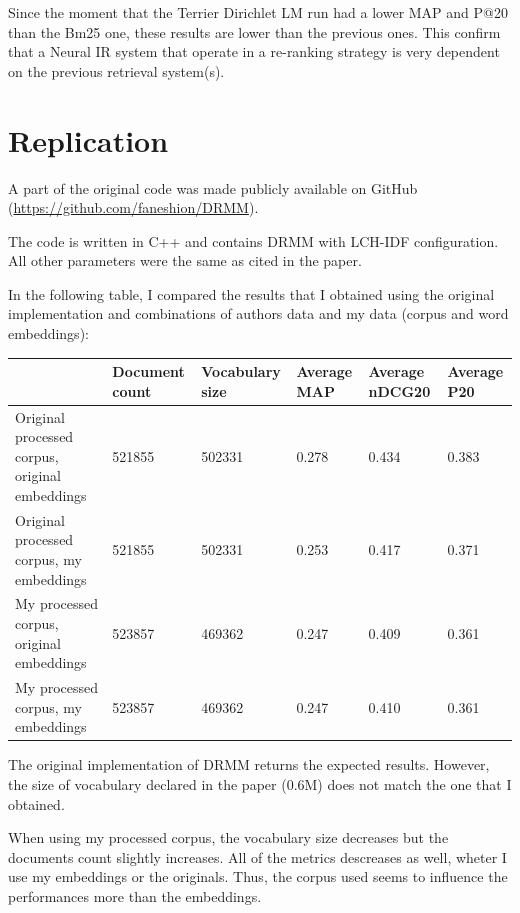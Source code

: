Since the moment that the Terrier Dirichlet LM run had a lower MAP and P@20 than the Bm25 one, these results are lower than the previous ones. This confirm that a Neural IR system that operate in a re-ranking strategy is very dependent on the previous retrieval system(s).

\section{Replication}

A part of the original code was made publicly available on GitHub (\url{https://github.com/faneshion/DRMM}).

The code is written in C++ and contains DRMM with LCH-IDF configuration. All other parameters were the same as cited in the paper.

In the following table, I compared the results that I obtained using the original implementation and combinations of authors data and my data (corpus and word embeddings):

\begin{adjustbox}{center, caption={Replication of the original experiments (extended with my data)}, nofloat=table}
\centering
\begin{tabular}{p{5cm}p{1.7cm}p{2cm}p{1.3cm}p{1.3cm}p{1.3cm}} 
 \hline
 & Document count & Vocabulary size & Average MAP & Average nDCG\@20 & Average P\@20 \\
 \hline
 Original processed corpus, original embeddings & 521855 & 502331 & 0.278 & 0.434 & 0.383 \\ 
 Original processed corpus, my embeddings & 521855 & 502331 & 0.253 & 0.417 & 0.371 \\
 My processed corpus, original embeddings & 523857 & 469362 & 0.247 & 0.409 & 0.361 \\
 My processed corpus, my embeddings & 523857 & 469362 & 0.247 & 0.410 & 0.361 \\
 \hline
\end{tabular}
\end{adjustbox}

The original implementation of DRMM returns the expected results. However, the size of vocabulary declared in the paper (0.6M) does not match the one that I obtained.

When using my processed corpus, the vocabulary size decreases but the documents count slightly increases. All of the metrics descreases as well, wheter I use my embeddings or the originals. Thus, the corpus used seems to influence the performances more than the embeddings.

